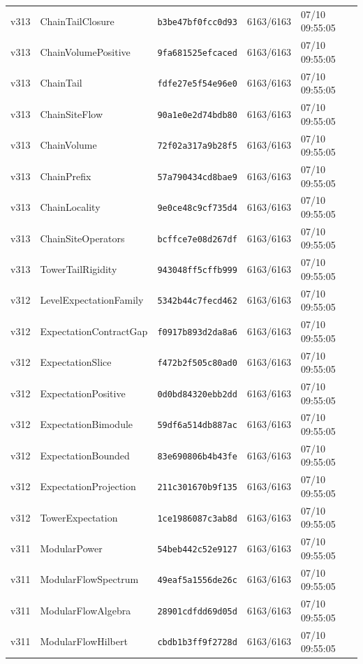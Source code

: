 \documentclass[11pt]{article}
\theoremstyle{definition}\newtheorem{deriv}{Derivação}
\begin{document}
{\begin{longtable}{@{}lllll@{}}
v313 & ChainTailClosure & \texttt{b3be47bf0fcc0d93} & 6163/6163 & 07/10 09:55:05 \\
v313 & ChainVolumePositive & \texttt{9fa681525efcaced} & 6163/6163 & 07/10 09:55:05 \\
v313 & ChainTail & \texttt{fdfe27e5f54e96e0} & 6163/6163 & 07/10 09:55:05 \\
v313 & ChainSiteFlow & \texttt{90a1e0e2d74bdb80} & 6163/6163 & 07/10 09:55:05 \\
v313 & ChainVolume & \texttt{72f02a317a9b28f5} & 6163/6163 & 07/10 09:55:05 \\
v313 & ChainPrefix & \texttt{57a790434cd8bae9} & 6163/6163 & 07/10 09:55:05 \\
v313 & ChainLocality & \texttt{9e0ce48c9cf735d4} & 6163/6163 & 07/10 09:55:05 \\
v313 & ChainSiteOperators & \texttt{bcffce7e08d267df} & 6163/6163 & 07/10 09:55:05 \\
v313 & TowerTailRigidity & \texttt{943048ff5cffb999} & 6163/6163 & 07/10 09:55:05 \\
v312 & LevelExpectationFamily & \texttt{5342b44c7fecd462} & 6163/6163 & 07/10 09:55:05 \\
v312 & ExpectationContractGap & \texttt{f0917b893d2da8a6} & 6163/6163 & 07/10 09:55:05 \\
v312 & ExpectationSlice & \texttt{f472b2f505c80ad0} & 6163/6163 & 07/10 09:55:05 \\
v312 & ExpectationPositive & \texttt{0d0bd84320ebb2dd} & 6163/6163 & 07/10 09:55:05 \\
v312 & ExpectationBimodule & \texttt{59df6a514db887ac} & 6163/6163 & 07/10 09:55:05 \\
v312 & ExpectationBounded & \texttt{83e690806b4b43fe} & 6163/6163 & 07/10 09:55:05 \\
v312 & ExpectationProjection & \texttt{211c301670b9f135} & 6163/6163 & 07/10 09:55:05 \\
v312 & TowerExpectation & \texttt{1ce1986087c3ab8d} & 6163/6163 & 07/10 09:55:05 \\
v311 & ModularPower & \texttt{54beb442c52e9127} & 6163/6163 & 07/10 09:55:05 \\
v311 & ModularFlowSpectrum & \texttt{49eaf5a1556de26c} & 6163/6163 & 07/10 09:55:05 \\
v311 & ModularFlowAlgebra & \texttt{28901cdfdd69d05d} & 6163/6163 & 07/10 09:55:05 \\
v311 & ModularFlowHilbert & \texttt{cbdb1b3ff9f2728d} & 6163/6163 & 07/10 09:55:05 \\

\end{longtable}}
\end{document}

